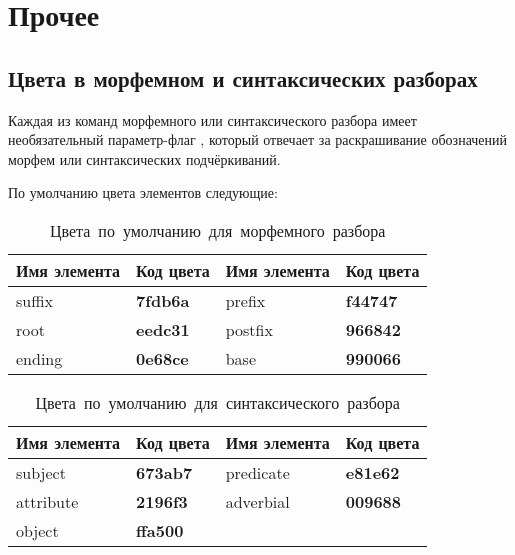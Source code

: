 \section{Прочее}

\subsection{Цвета в морфемном и синтаксических разборах}

Каждая из команд морфемного или синтаксического разбора имеет необязательный
параметр-флаг \manKwargs[color], который отвечает за раскрашивание обозначений морфем
или синтаксических подчёркиваний.

По умолчанию цвета элементов следующие:


\renewcommand{\arraystretch}{1.125}
\begin{table}[ht!]
    \centering
    \small
    \begin{tabular}{@{}llll@{}}
        \toprule
        Имя элемента & Код цвета & Имя элемента & Код цвета\\\midrule
suffix & { \color[HTML]{7fdb6a} \textbf{7fdb6a} } & prefix & { \color[HTML]{f44747} \textbf{f44747} }\\\midrule
root & { \color[HTML]{eedc31} \textbf{eedc31} } & postfix & { \color[HTML]{966842} \textbf{966842} }\\\midrule
ending & { \color[HTML]{0e68ce} \textbf{0e68ce} } & base & { \color[HTML]{990066} \textbf{990066} }
        \\\bottomrule
    \end{tabular}

    \caption{Цвета~по~умолчанию~для~морфемного~разбора}
\end{table}



\renewcommand{\arraystretch}{1.125}
\begin{table}[ht!]
    \centering
    \small
    \begin{tabular}{@{}llll@{}}
        \toprule
        Имя элемента & Код цвета & Имя элемента & Код цвета\\\midrule
subject & { \color[HTML]{673ab7} \textbf{673ab7} } & predicate & { \color[HTML]{e81e62} \textbf{e81e62} }\\\midrule
attribute & { \color[HTML]{2196f3} \textbf{2196f3} } & adverbial & { \color[HTML]{009688} \textbf{009688} }\\\midrule
object & { \color[HTML]{ffa500} \textbf{ffa500} }
        \\\bottomrule
    \end{tabular}

    \caption{Цвета~по~умолчанию~для~синтаксического~разбора}
\end{table}



